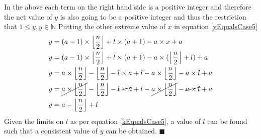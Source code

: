 \documentclass[10pt, twoside]{article}
\newcommand{\floordivision}[2]{\left\lfloor \frac{#1}{#2} \right\rfloor}
\begin{document}
In the above each term on the right hand side is a positive integer and therefore the net value of $y$ is also going to be a positive integer and thus the restriction that $1 \leq y, y \in \mathbb{N}$\newline
Putting the other extreme value of $x$ in equation \eqref{yEqualsCase5}
\begin{align*}
	y &= (a-1)\times \floordivision{n}{2} + l\times(a+1) - a\times x + a \\
	y &= (a-1)\times \floordivision{n}{2} + l\times(a+1) - a\times (\floordivision{n}{2}+l) + a \\	
	y &= a\times \floordivision{n}{2} - \floordivision{n}{2} - l\times a + l -a\times \floordivision{n}{2} - a \times l + a \\
	y &= \cancel{a\times \floordivision{n}{2}} - \floordivision{n}{2} - \cancel{l\times a} + l -\cancel{a\times \floordivision{n}{2}} - \cancel{a \times l} + a \\
	y &= a - \floordivision{n}{2} + l \\
\end{align*}
Given the limits on $l$ as per equation \eqref{kEqualsCase5}, a value of $l$ can be found such that a consistent value of $y$ can be obtained. $\blacksquare$\\
\end{document}
